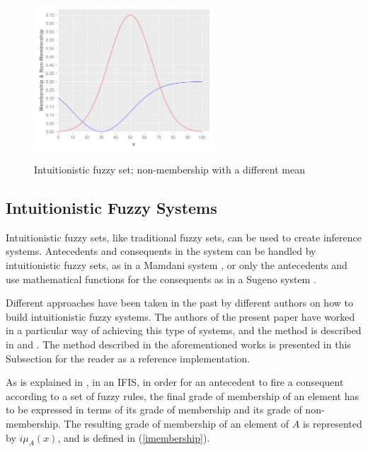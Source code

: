 \documentclass[review]{elsarticle}
\begin{document}
\begin{figure}
\caption{Intuitionistic fuzzy set; non-membership with a different mean}
\centering
\includegraphics[width=0.6\textwidth]{img/ifs-diff-mu-sd.pdf}
\label{figure:agent-based-model}
\end{figure}

\subsection{Intuitionistic Fuzzy Systems}
\label{subsection:intuitionistic-fuzzy-systems}

Intuitionistic fuzzy sets, like traditional fuzzy sets, can be used to create
inference systems. Antecedents and consequents in the system can be handled by
intuitionistic fuzzy sets, as in a Mamdani system \cite{Mamdani1975}, or only
the antecedents and use mathematical functions for the consequents as in a
Sugeno system \cite{Takagi1985}.

Different approaches have been taken in the past by different authors on how to
build intuitionistic fuzzy systems. The authors of the present paper have worked
in a particular way of achieving this type of systems, and the method is
described in \cite{Hernandez-Aguila2016} and \cite{Hernandez-Aguila2017-2}. The
method described in the aforementioned works is presented in this Subsection for
the reader as a reference implementation.


As is explained in \cite{Hernandez-Aguila2016}, in an IFIS, in order for an
antecedent to fire a consequent according to a set of fuzzy rules, the final
grade of membership of an element has to be expressed in terms of its grade of
membership and its grade of non-membership. The resulting grade of membership of
an element of $A$ is represented by $i\mu_{A}(x)$, and is defined in
(\ref{imembership}).
\end{document}
